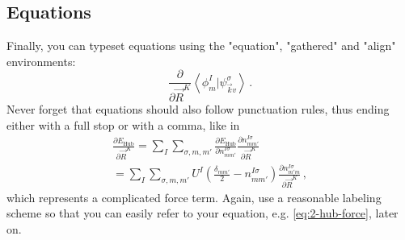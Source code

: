     \subsection{Equations}
        \label{subsec:eqs}
    Finally, you can typeset equations using the "equation", "gathered" and "align" environments:
    \begin{equation}
     \frac{\partial}{\partial\vec{R}^K}\left\langle \phi^I_m | \psi^\sigma_{\vec{k}v} \right\rangle   \,.
     \label{eq:2-hub-force}
    \end{equation}
    Never forget that equations should also follow punctuation rules, thus ending either with a full stop or with a comma, like in
    \begin{equation}
        \begin{gathered}
        \frac{\partial E_\mathrm{Hub}}{\partial \vec{R}^K} = \sum_{I}\sum_{\sigma,m,m'} \frac{\partial E_\mathrm{Hub}}{\partial n^{I\sigma}_{mm'}} \frac{\partial n^{I\sigma}_{mm'}}{\partial\vec{R}^K} \\
        = \sum_{I}\sum_{\sigma,m,m'} U^I\left( \frac{\delta_{mm'}}{2}-  n^{I\sigma}_{mm'} \right) \frac{\partial n^{I\sigma}_{m'm}}{\partial\vec{R}^K} \, ,
        \end{gathered}
        \label{eq:2-hub-force2}
    \end{equation}
    which represents a complicated force term.
    Again, use a reasonable labeling scheme so that you can easily refer to your equation, e.g. \cref{eq:2-hub-force}, later on.